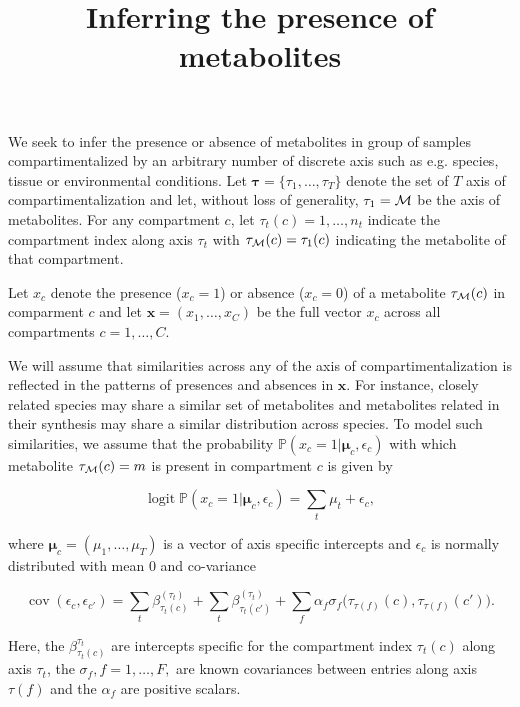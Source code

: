 \documentclass[a4paper,10pt]{article}
\title{Inferring the presence of metabolites}
\DeclareMathOperator{\logit}{logit}
\DeclareMathOperator{\cov}{cov}
\def\P{\mathbb{P}}
\def\x{\boldsymbol{x}}
\def\btau{\boldsymbol{\tau}}
\def\M{{\cal M}}
\def\bmu{\boldsymbol{\mu}}
\begin{document}
\maketitle

We seek to infer the presence or absence of metabolites in group of samples compartimentalized by an arbitrary number of discrete axis such as e.g. species, tissue or environmental conditions. Let $\btau = \{\tau_1, \ldots, \tau_T\}$  denote the set of $T$ axis of compartimentalization and let, without loss of generality, $\tau_1=\M$ be the axis of metabolites. For any compartment $c$, let $\tau_t(c) = 1, \ldots, n_t$ indicate the compartment index along axis $\tau_t$ with $\tau_\M(c) = \tau_1(c)$ indicating the metabolite of that compartment.

Let $x_{c}$ denote the presence ($x_c=1$) or absence ($x_c=0$) of a metabolite $\tau_\M(c)$ in comparment $c$ and let $\x=(x_1, \ldots, x_C)$ be the full vector $x_c$ across all compartments $c=1, \ldots, C$.

We will assume that similarities across any of the axis of compartimentalization is reflected in the patterns of presences and absences in $\x$. For instance, closely related species may share a similar set of metabolites and  metabolites related in their synthesis may share a similar distribution across species. To model such similarities, we assume that the probability $\P(x_c=1|\bmu_c, \epsilon_c)$ with which metabolite $\tau_\M(c)=m$ is present in compartment $c$ is given by

\begin{equation*}
 \logit \P(x_c=1|\bmu_c, \epsilon_c) = \sum_t \mu_t + \epsilon_{c},
\end{equation*}

where $\bmu_c=(\mu_1, \ldots, \mu_T)$ is a vector of axis specific intercepts and $\epsilon_{c}$ is normally distributed with mean 0 and co-variance

\begin{equation}
 \cov(\epsilon_c, \epsilon_{c'}) = \sum_t \beta^{(\tau_t)}_{\tau_t(c)} + \sum_t \beta^{(\tau_t)}_{\tau_t(c')} + \sum_f \alpha_f \sigma_f\Big(\tau_{\tau(f)}(c), \tau_{\tau(f)}(c')\Big).
\end{equation}


Here, the $\beta^{\tau_t}_{\tau_t(c)}$ are intercepts specific for the compartment index $\tau_t(c)$ along axis $\tau_t$, the $\sigma_{f}, f=1, \ldots, F,$ are known covariances between entries along axis $\tau(f)$ and the $\alpha_f$ are positive scalars.
\end{document}
